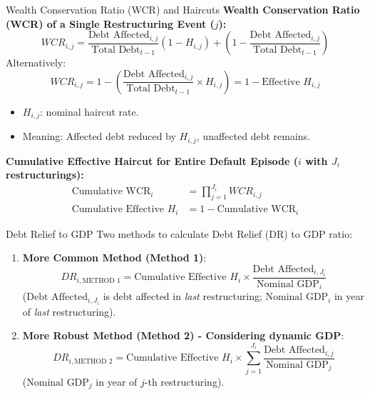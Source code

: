 \documentclass{beamer}
\begin{document}
\begin{frame}{Wealth Conservation Ratio (WCR) and Haircuts}
  \textbf{Wealth Conservation Ratio (WCR) of a Single Restructuring Event ($j$):}
  \begin{equation} \label{eq:wcr_slide}
    WCR_{i,j} = \frac{\text{Debt Affected}_{i,j}}{\text{Total Debt}_{t-1}} (1 - H_{i,j}) + \left(1 - \frac{\text{Debt Affected}_{i,j}}{\text{Total Debt}_{t-1}}\right)
  \end{equation}
  Alternatively:
  \begin{equation*}
    WCR_{i,j} = 1 - \left(\frac{\text{Debt Affected}_{i,j}}{\text{Total Debt}_{t-1}} \times H_{i,j}\right) = 1 - \text{Effective } H_{i,j}
  \end{equation*}
  \begin{itemize}
    \item $H_{i,j}$: nominal haircut rate.
    \item Meaning: Affected debt reduced by $H_{i,j}$, unaffected debt remains.
  \end{itemize}
  \textbf{Cumulative Effective Haircut for Entire Default Episode ($i$ with $J_i$ restructurings):}
  \begin{align*}
    \text{Cumulative WCR}_i &= \prod_{j=1}^{J_i} WCR_{i,j} \\
    \text{Cumulative Effective } H_i &= 1 - \text{Cumulative WCR}_i
  \end{align*}
\end{frame}

\begin{frame}{Debt Relief to GDP}
  Two methods to calculate Debt Relief (DR) to GDP ratio:
  \begin{enumerate}
    \item \textbf{More Common Method (Method 1)}:
    \begin{equation*}
        DR_{i, \text{METHOD 1}} = \text{Cumulative Effective } H_i \times \frac{\text{Debt Affected}_{i,J_i}}{\text{Nominal GDP}_i}
    \end{equation*}
    ($\text{Debt Affected}_{i,J_i}$ is debt affected in \textit{last} restructuring; $\text{Nominal GDP}_i$ in year of \textit{last} restructuring).
    \item \textbf{More Robust Method (Method 2) - Considering dynamic GDP}:
    \begin{equation*}
        DR_{i, \text{METHOD 2}} = \text{Cumulative Effective } H_i \times \sum_{j=1}^{J_i} \frac{\text{Debt Affected}_{i,j}}{\text{Nominal GDP}_j}
    \end{equation*}
    ($\text{Nominal GDP}_j$ in year of $j$-th restructuring).
  \end{enumerate}
\end{frame}
\end{document}

